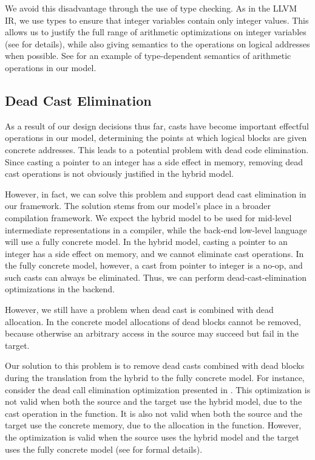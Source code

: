 We avoid this disadvantage through the use of type checking. 
As in the LLVM IR, we use types to ensure that integer variables contain only integer values.
This allows us to justify the full range of arithmetic optimizations on integer variables (see  for details), 
while also giving semantics to the operations on logical addresses when possible.
See  for an example of type-dependent semantics of arithmetic operations in our model.

\subsection{Dead Cast Elimination}
\label{sec:intptrcast:formal-semantics:deadcast}

As a result of our design decisions thus far, casts have become
important effectful operations in our model, determining the points at
which logical blocks are given concrete addresses. This leads to a
potential problem with dead code elimination.  Since casting a pointer
to an integer has a side effect in memory, removing dead cast
operations is not obviously justified in the hybrid model.

However, in fact,
we can solve this problem and support dead cast elimination in our
framework. 
The solution stems from our model's place in a broader compilation
framework. We expect the hybrid model to be used for mid-level
intermediate representations in a compiler, while the back-end
low-level language will use a fully concrete model. In the
hybrid model, casting a pointer to an integer has a side
effect on memory, and we cannot eliminate cast operations. In the
fully concrete model, however, a cast from pointer to integer is a 
no-op, and such casts can always be eliminated. Thus, we can
perform dead-cast-elimination optimizations in the backend.

However, we still have a problem when dead cast is combined with dead
allocation. In the concrete model allocations of dead blocks cannot be
removed, because otherwise an arbitrary access in the source may
succeed but fail in the target. 

Our solution to this problem is to remove dead casts combined with dead blocks during the
translation from the hybrid to the fully concrete model.  For instance, consider the dead call
elimination optimization presented in . This
optimization is not valid when both the source and the target use the hybrid model, due to the cast
operation in the function. It is also not valid when both the source and the target use the concrete
memory, due to the allocation in the function. However, the optimization is valid when the source
uses the hybrid model and the target uses the fully concrete model (see
 for formal details).

